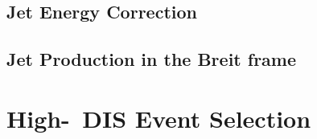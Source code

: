 \subsection{Jet Energy Correction}
\label{subsec:jetcor}


\subsection{Jet Production in the Breit frame}
\label{subsec:jetsinbreit}


\section{High-\qsq\, DIS Event Selection}
\label{sec:dissel}

